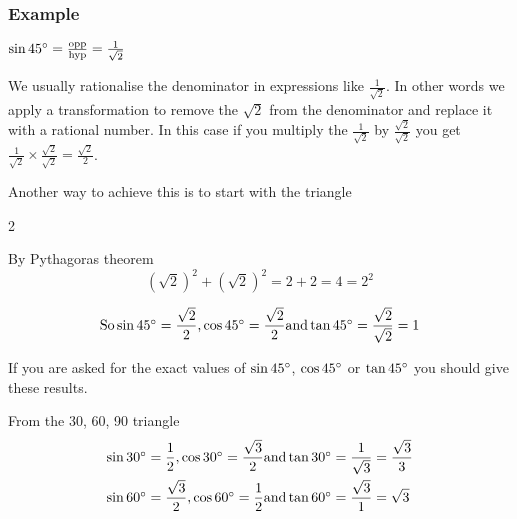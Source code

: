 \subsubsection{Example}
$\sin  45 \mbox{{\ensuremath{{}^\circ}}} =\frac{\text{opp}}{\text{hyp}} =\frac{1}{\sqrt{2}}$ 

We usually rationalise the denominator in expressions like $\frac{1}{\sqrt{2}}$. In other words we apply a transformation to remove the $\sqrt{2}$ from the denominator and replace it with a rational number. In this case if you multiply
the $\frac{1}{\sqrt{2}}$ by $\frac{\sqrt{2}}{\sqrt{2}}$ you get $\frac{1}{\sqrt{2}} \times \frac{\sqrt{2}}{\sqrt{2}} =\frac{\sqrt{2}}{2}$. 

Another way to achieve this is to start with the triangle 


\columnsep =30pt
\begin {multicols}{2}
 

   
\setlength\fboxrule{0in}\setlength\fboxsep{0.2in}


By Pythagoras theorem
\begin{equation*}\left (\sqrt{2}\right )^{2} +\left (\sqrt{2}\right )^{2} =2 +2 =4 =2^{2}
\end{equation*}


\end {multicols}
\begin{equation*}\text{So}\sin  45 \mbox{{\ensuremath{{}^\circ}}} =\frac{\sqrt{2}}{2}\text{,}\cos  45 \mbox{{\ensuremath{{}^\circ}}} =\frac{\sqrt{2}}{2}\text{and}\tan  45 \mbox{{\ensuremath{{}^\circ}}} =\frac{\sqrt{2}}{\sqrt{2}} =1
\end{equation*}

If you are asked for the exact values of $\sin  45 \mbox{{\ensuremath{{}^\circ}}}$, $\cos  45 \mbox{{\ensuremath{{}^\circ}}}$ or $\tan  45 \mbox{{\ensuremath{{}^\circ}}}$ you should give these results. 

From the 30, 60, 90 triangle
\begin{align*}\sin  30 \mbox{{\ensuremath{{}^\circ}}} &  =  \frac{1}{2}\text{,}\cos  30 \mbox{{\ensuremath{{}^\circ}}} =\frac{\sqrt{3}}{2}\text{and}\tan  30 \mbox{{\ensuremath{{}^\circ}}} =\frac{1}{\sqrt{3}} =\frac{\sqrt{3}}{3} \\
\sin  60 \mbox{{\ensuremath{{}^\circ}}} &  = \frac{\sqrt{3}}{2}\text{,}\cos  60 \mbox{{\ensuremath{{}^\circ}}} =\frac{1}{2}\text{and}\tan  60 \mbox{{\ensuremath{{}^\circ}}} =\frac{\sqrt{3}}{1} =\sqrt{3}\end{align*}

